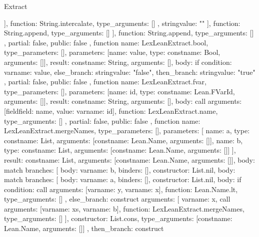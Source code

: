 \begin{lexlean}{Extract}
\begin{toolingmodule}
{{{{{{                ],
                function: String.intercalate,
                type_arguments: []
              },
              string{value: "}"}
            ],
            function: String.append,
            type_arguments: []
          }
        ],
        function: String.append,
        type_arguments: []
      },
      partial: false,
      public: false
    },
    function{
      name: LexLeanExtract.bool,
      type_parameters: [],
      parameters: [{name: value, type: const{name: Bool, arguments: []}}],
      result: const{name: String, arguments: []},
      body: if{
        condition: var{name: value},
        else_branch: string{value: "false"},
        then_branch: string{value: "true"}
      },
      partial: false,
      public: false
    },
    function{
      name: LexLeanExtract.fvar,
      type_parameters: [],
      parameters: [{name: id, type: const{name: Lean.FVarId, arguments: []}}],
      result: const{name: String, arguments: []},
      body: call{
        arguments: [field{field: name, value: var{name: id}}],
        function: LexLeanExtract.name,
        type_arguments: []
      },
      partial: false,
      public: false
    },
    function{
      name: LexLeanExtract.mergeNames,
      type_parameters: [],
      parameters: [
        {name: a, type: const{name: List, arguments: [const{name: Lean.Name, arguments: []}]}},
        {name: b, type: const{name: List, arguments: [const{name: Lean.Name, arguments: []}]}}
      ],
      result: const{name: List, arguments: [const{name: Lean.Name, arguments: []}]},
      body: match{
        branches: [
          {body: var{name: b}, binders: [], constructor: List.nil},
          {
            body: match{
              branches: [
                {body: var{name: a}, binders: [], constructor: List.nil},
                {
                  body: if{
                    condition: call{
                      arguments: [var{name: y}, var{name: x}],
                      function: Lean.Name.lt,
                      type_arguments: []
                    },
                    else_branch: construct{
                      arguments: [
                        var{name: x},
                        call{
                          arguments: [var{name: xs}, var{name: b}],
                          function: LexLeanExtract.mergeNames,
                          type_arguments: []
                        }
                      ],
                      constructor: List.cons,
                      type_arguments: [const{name: Lean.Name, arguments: []}]
                    },
                    then_branch: construct{
}}}}}}}}
\end{toolingmodule}
\end{lexlean}
